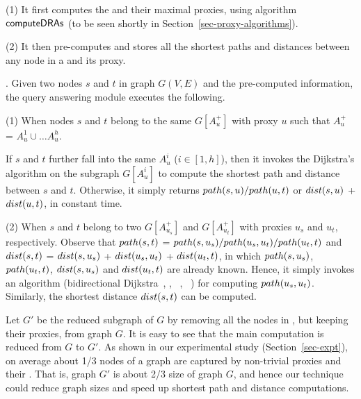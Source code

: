 \noindent(1) It first computes the \dras and their maximal proxies,  using algorithm ${\mathsf{computeDRAs}}$ (to be seen shortly in Section~\ref{sec-proxy-algorithms}).

\noindent(2) It then pre-computes and stores all the shortest paths and distances between any node in a \dra and its proxy.


. Given two nodes $s$ and $t$ in graph $G(V, E)$  and the pre-computed information, the query answering module executes the following.


\noindent(1) When nodes $s$ and $t$ belong to the same \dra $G[A^+_u]$ with proxy $u$ such that $A^+_u$ = $A^1_u\cup\ldots A^h_u$.

If $s$ and $t$ further fall into the same $A^i_u$ ($i\in[1,h]$), then it invokes the Dijkstra's algorithm on the subgraph $G[A^i_u]$ to compute the shortest path and distance between $s$ and $t$. Otherwise, it simply returns $\path(s, u)/\path(u, t)$ or $\dist(s, u)$ + $\dist(u, t)$, in constant time.

\noindent(2)  When $s$ and $t$ belong to two \dras $G[A^+_{u_s}]$ and $G[A^+_{u_t}]$ with proxies $u_s$ and $u_t$, respectively.
%
Observe that $\path(s, t)$ = $\path(s, u_s)/\path(u_s, u_t)/\path(u_t, t)$ and $\dist(s, t)$ = $\dist(s, u_s)$ + $\dist(u_s, u_t)$ + $\dist(u_t, t)$, in which $\path(s, u_s)$, $\path(u_t, t)$, $\dist(s, u_s)$ and $\dist(u_t, t)$ are already known. Hence, it simply invokes an algorithm (\eg bidirectional Dijkstra~\cite{LubyR89}, \arcflag \cite{MohringSSWW05}, \ch~\cite{GeisbergerSSD08}, \tnr~\cite{bast2014route}) for computing $\path(u_s, u_t)$.
Similarly, the shortest distance $\dist(s, t)$ can be computed.

 Let $G'$ be the reduced subgraph of $G$ by removing all the nodes in \dras, but keeping their proxies, from graph $G$. It is easy to see that the main computation is reduced from $G$ to $G'$.   As shown in our experimental study (Section~\ref{sec-expt}), on average about 1/3 nodes of a graph are captured by non-trivial proxies and their \dras. That is, graph $G'$ is about 2/3 size of graph $G$, and hence our technique could reduce graph sizes and speed up shortest path and distance computations.

